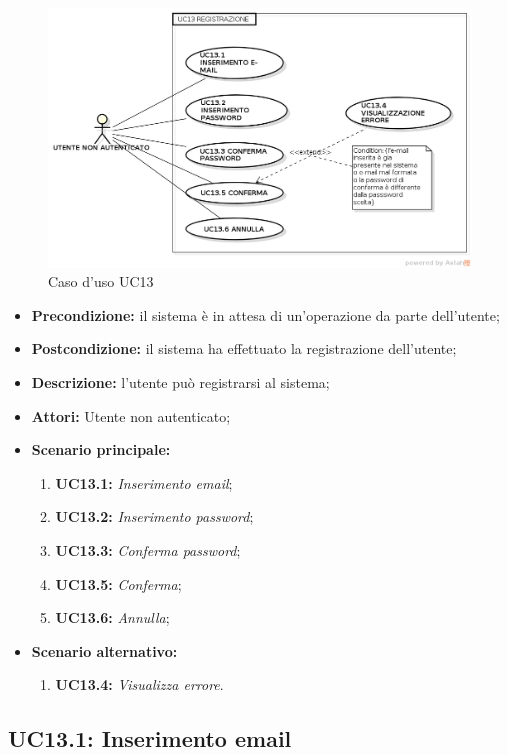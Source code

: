 \begin{figure}[h]
	\begin{center}
	\includegraphics[scale=0.4]{diagram/UC13.png}
	\caption{Caso d'uso UC13}
	\end{center}
\end{figure}
\begin{itemize}
	\item \textbf{Precondizione:} il sistema è in attesa di un'operazione da parte dell'utente;
	\item \textbf{Postcondizione:} il sistema ha effettuato la registrazione dell'utente;
	\item \textbf{Descrizione:} l'utente può registrarsi al sistema;
	\item \textbf{Attori:} Utente non autenticato;
	\item \textbf{Scenario principale:}
	\begin{enumerate}
		\item \textbf{ UC13.1:} \textit{ Inserimento email};
		\item \textbf{ UC13.2:} \textit{ Inserimento password};
		\item \textbf{ UC13.3:} \textit{ Conferma password};
		\item \textbf{ UC13.5:} \textit{ Conferma};
		\item \textbf{ UC13.6:} \textit{ Annulla};
	\end{enumerate}
	\item \textbf{Scenario alternativo:}
	\begin{enumerate}
		\item \textbf{ UC13.4:} \textit{ Visualizza errore}.
	\end{enumerate}
\end{itemize}
\subsection{ UC13.1: Inserimento email}

